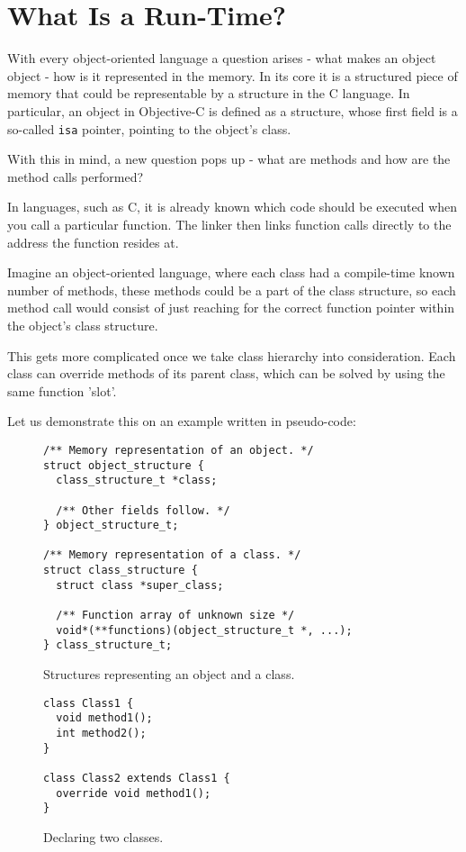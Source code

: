 \chapter{What Is a Run-Time?}

With every object-oriented language a question arises - what makes an object object - how is it represented in the memory. In its core it is a structured piece of memory that could be representable by a structure in the C language. In particular, an object in Objective-C is defined as a structure, whose first field is a so-called \verb=isa= pointer, pointing to the object's class.

With this in mind, a new question pops up - what are methods and how are the method calls performed?

In languages, such as C, it is already known which code should be executed when you call a particular function. The linker then links function calls directly to the address the function resides at. 

Imagine an object-oriented language, where each class had a compile-time known number of methods, these methods could be a part of the class structure, so each method call would consist of just reaching for the correct function pointer within the object's class structure.

This gets more complicated once we take class hierarchy into consideration. Each class can override methods of its parent class, which can be solved by using the same function 'slot'.

Let us demonstrate this on an example written in pseudo-code:

\begin{figure}[H]
  \begin{verbatim}
/** Memory representation of an object. */
struct object_structure {
  class_structure_t *class;
  
  /** Other fields follow. */
} object_structure_t;

/** Memory representation of a class. */
struct class_structure {
  struct class *super_class;
  
  /** Function array of unknown size */
  void*(**functions)(object_structure_t *, ...);
} class_structure_t;
  \end{verbatim}
  \centering{}
  \caption{Structures representing an object and a class.}
  \label{fig:imaginary_lang_structs}
\end{figure}


\begin{figure}[H]
  \begin{verbatim}
class Class1 {
  void method1();
  int method2();
}

class Class2 extends Class1 {
  override void method1();
}
  \end{verbatim}
  \centering{}
  \caption{Declaring two classes.}
  \label{fig:imaginary_lang_classes}
\end{figure}

